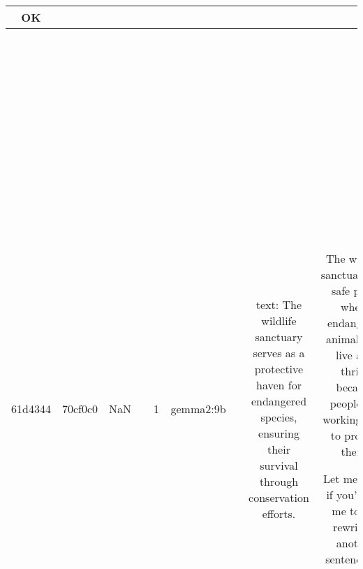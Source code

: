 \begin{table}[h!]
\begin{tabular}{|c|c|c|c|c|c|c|c|c|c|c|}
OK\\
\hline
61d4344 & 70cf0c0 & NaN &  & 1 & gemma2:9b &  & text: The wildlife sanctuary serves as a protective haven for endangered species, ensuring their survival through conservation efforts. & The wildlife sanctuary is a safe place where endangered animals can live and thrive because people are working hard to protect them. 


Let me know if you'd like me to try rewriting another sentence!  😊  
 & err & The output provided by the chatbot does not contain any direct violations of the description related to enhancing readability and making the sentence more conversational. However, the output includes an additional sentence, "Let me know if you'd like me to try rewriting another sentence! 😊", which does not comply with the task of rewriting a given sentence. The description provided is for rewriting a single sentence and does not mention adding any additional sentences or user interaction.

ERR\\
\hline
61d4344 & 70cf0c0 & NaN &  & 1 & qwen2.5:3b &  & text: The wildlife sanctuary serves as a protective haven for endangered species, ensuring their survival through conservation efforts. & Here's a more conversational version of the sentence:

The wildlife sanctuary is like a safe spot where endangered animals can stay protected, and we work hard to keep them alive through all sorts of conservation stuff. & ok & The chatbot output presents a more conversational version of a sentence, following the directive to utilize relatable and easy-to-understand language. It transforms potentially complex terms like "wildlife sanctuary," "endangered animals," "stay protected," and "conservation" into more accessible language ("safe spot," "stay protected," and "conservation stuff"). As an evaluator, I must determine if it enhances readability and maintains the original message's intent and factual accuracy, which is not a task I can verify without the input.

Based on the task description, I must evaluate the compliance of the chatbot output solely based on rules not needing the original input. The chatbot output is indeed simplified and engaging, employing relatable language and a casual tone, which makes it sound conversational. Therefore, I observe no elements in this output that violate the provided description's compliance guidelines.

No violation. 
OK\\
\hline
61d4344 & 70cf0c0 & NaN &  & 1 & llama3.2:1b &  & text: The wildlife sanctuary serves as a protective haven for endangered species, ensuring their survival through conservation efforts. & Here's a rewritten version with some improvements to enhance readability and conversational tone:


\end{tabular}
\end{table}
